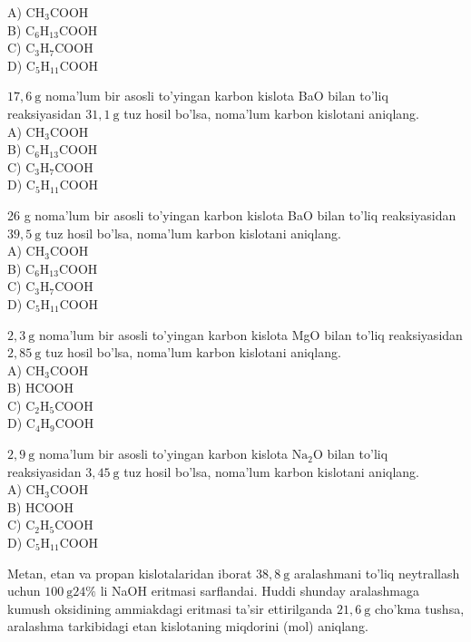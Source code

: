 A) $\mathrm{CH}_{3} \mathrm{COOH}$\\
B) $\mathrm{C}_{6} \mathrm{H}_{13} \mathrm{COOH}$\\
C) $\mathrm{C}_{3} \mathrm{H}_{7} \mathrm{COOH}$\\
D) $\mathrm{C}_{5} \mathrm{H}_{11} \mathrm{COOH}$
  \item $17,6 \mathrm{~g}$ noma'lum bir asosli to'yingan karbon kislota BaO bilan to'liq reaksiyasidan $31,1 \mathrm{~g}$ tuz hosil bo'lsa, noma'lum karbon kislotani aniqlang.\\
A) $\mathrm{CH}_{3} \mathrm{COOH}$\\
B) $\mathrm{C}_{6} \mathrm{H}_{13} \mathrm{COOH}$\\
C) $\mathrm{C}_{3} \mathrm{H}_{7} \mathrm{COOH}$\\
D) $\mathrm{C}_{5} \mathrm{H}_{11} \mathrm{COOH}$
  \item 26 g noma'lum bir asosli to'yingan karbon kislota BaO bilan to'liq reaksiyasidan $39,5 \mathrm{~g}$ tuz hosil bo'lsa, noma'lum karbon kislotani aniqlang.\\
A) $\mathrm{CH}_{3} \mathrm{COOH}$\\
B) $\mathrm{C}_{6} \mathrm{H}_{13} \mathrm{COOH}$\\
C) $\mathrm{C}_{3} \mathrm{H}_{7} \mathrm{COOH}$\\
D) $\mathrm{C}_{5} \mathrm{H}_{11} \mathrm{COOH}$
  \item $2,3 \mathrm{~g}$ noma'lum bir asosli to'yingan karbon kislota MgO bilan to'liq reaksiyasidan $2,85 \mathrm{~g}$ tuz hosil bo'lsa, noma'lum karbon kislotani aniqlang.\\
A) $\mathrm{CH}_{3} \mathrm{COOH}$\\
B) HCOOH\\
C) $\mathrm{C}_{2} \mathrm{H}_{5} \mathrm{COOH}$\\
D) $\mathrm{C}_{4} \mathrm{H}_{9} \mathrm{COOH}$
  \item $2,9 \mathrm{~g}$ noma'lum bir asosli to'yingan karbon kislota $\mathrm{Na}_{2} \mathrm{O}$ bilan to'liq reaksiyasidan $3,45 \mathrm{~g}$ tuz hosil bo'lsa, noma'lum karbon kislotani aniqlang.\\
A) $\mathrm{CH}_{3} \mathrm{COOH}$\\
B) HCOOH\\
C) $\mathrm{C}_{2} \mathrm{H}_{5} \mathrm{COOH}$\\
D) $\mathrm{C}_{5} \mathrm{H}_{11} \mathrm{COOH}$
  \item Metan, etan va propan kislotalaridan iborat $38,8 \mathrm{~g}$ aralashmani to'liq neytrallash uchun $100 \mathrm{~g} 24 \%$ li NaOH eritmasi sarflandai. Huddi shunday aralashmaga kumush oksidining ammiakdagi eritmasi ta'sir ettirilganda $21,6 \mathrm{~g}$ cho'kma tushsa, aralashma tarkibidagi etan kislotaning miqdorini (mol) aniqlang.\\
